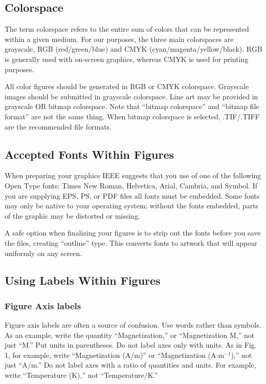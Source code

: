 \documentclass[journal,twoside,web]{ieeecolor}
\begin{document}
\subsection{Colorspace}
The term colorspace refers to the entire sum of colors that can be
represented within a given medium. For our purposes, the three main colorspaces
are grayscale, RGB (red/green/blue) and CMYK (cyan/magenta/yellow/black).
RGB is generally used with on-screen graphics, whereas CMYK is used for printing purposes.

All color figures should be generated in RGB or CMYK colorspace. Grayscale
images should be submitted in grayscale colorspace. Line art may be
provided in grayscale OR bitmap colorspace. Note that ``bitmap colorspace''
and ``bitmap file format'' are not the same thing. When bitmap colorspace
is selected, .TIF/.TIFF are the recommended file formats.

\subsection{Accepted Fonts Within Figures}
When preparing your graphics IEEE suggests that you use of one of the
following Open Type fonts: Times New Roman, Helvetica, Arial, Cambria, and
Symbol. If you are supplying EPS, PS, or PDF files all fonts must be
embedded. Some fonts may only be native to your operating system; without
the fonts embedded, parts of the graphic may be distorted or missing.

A safe option when finalizing your figures is to strip out the fonts before
you save the files, creating ``outline'' type. This converts fonts to
artwork that will appear uniformly on any screen.

\subsection{Using Labels Within Figures}

\subsubsection{Figure Axis labels}
Figure axis labels are often a source of confusion. Use words rather than
symbols. As an example, write the quantity ``Magnetization,'' or
``Magnetization M,'' not just ``M.'' Put units in parentheses. Do not label
axes only with units. As in Fig. 1, for example, write ``Magnetization
(A/m)'' or ``Magnetization (A$\cdot$m$^{-1}$),'' not just ``A/m.''
Do not label axes with a ratio of quantities and units.
For example, write ``Temperature (K),'' not ``Temperature/K.''
\end{document}
